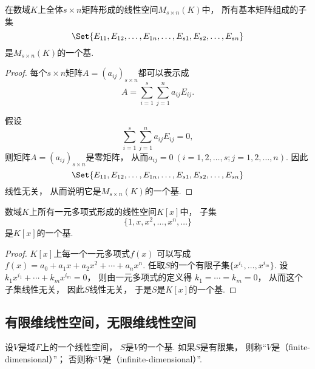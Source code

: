 \begin{example}
在数域\(K\)上全体\(s \times n\)矩阵形成的线性空间\(M_{s \times n}(K)\)中，
所有基本矩阵组成的子集\begin{equation*}
	\Set{
		E_{11},E_{12},\dotsc,E_{1n},
		\dotsc,
		E_{s1},E_{s2},\dotsc,E_{sn}
	}
\end{equation*}是\(M_{s \times n}(K)\)的一个基.
\begin{proof}
每个\(s \times n\)矩阵\(A = (a_{ij})_{s \times n}\)都可以表示成\begin{equation*}
	A = \sum_{i=1}^s \sum_{j=1}^n a_{ij} E_{ij}.
\end{equation*}

假设\begin{equation*}
	\sum_{i=1}^s \sum_{j=1}^n a_{ij} E_{ij} = 0,
\end{equation*}
则矩阵\(A = (a_{ij})_{s \times n}\)是零矩阵，
从而\(a_{ij} = 0\ (i=1,2,\dotsc,s;j=1,2,\dotsc,n)\).
因此\begin{equation*}
	\Set{
		E_{11},E_{12},\dotsc,E_{1n},
		\dotsc,
		E_{s1},E_{s2},\dotsc,E_{sn}
	}
\end{equation*}线性无关，
从而说明它是\(M_{s \times n}(K)\)的一个基.
\end{proof}
\end{example}

\begin{example}
数域\(K\)上所有一元多项式形成的线性空间\(K[x]\)中，
子集\begin{equation*}
	\{1,x,x^2,\dotsc,x^n,\dotsc\}
\end{equation*}是\(K[x]\)的一个基.
\begin{proof}
\(K[x]\)上每一个一元多项式\(f(x)\)
可以写成\(f(x)=a_0+a_1 x+a_2 x^2+\dotsb+a_n x^n\).
任取\(S\)的一个有限子集\(\{x^{i_1},\dotsc,x^{i_m}\}\).
设\(k_1 x^{i_1}+\dotsb+k_m x^{i_m}=0\)，
则由一元多项式的定义得
\(k_1=\dotsb=k_m=0\)，
从而这个子集线性无关，
因此\(S\)线性无关，
于是\(S\)是\(K[x]\)的一个基.
\end{proof}
\end{example}

\subsection{有限维线性空间，无限维线性空间}
\begin{definition}
设\(V\)是域\(F\)上的一个线性空间，
\(S\)是\(V\)的一个基.
如果\(S\)是有限集，
则称“\(V\)是（finite-dimensional）”；
否则称“\(V\)是（infinite-dimensional）”.
\end{definition}

